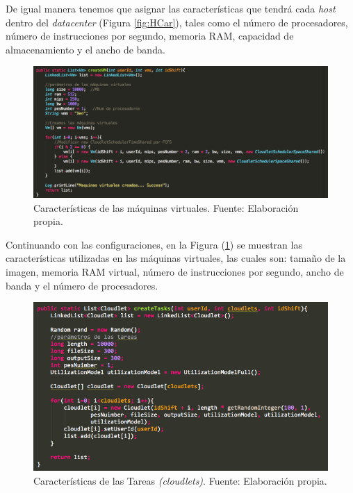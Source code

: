 De igual manera tenemos que asignar las caracter\'isticas que tendr\'a cada \textit{host} dentro del \textit{datacenter} (Figura \ref{fig:HCar}), tales como el n\'umero de procesadores, n\'umero de instrucciones por segundo, memoria RAM, capacidad de almacenamiento y el ancho de banda.

\newpage

\renewcommand\thefigure{\arabic{figure}}
\begin{figure}[h!]
	\centering
	\includegraphics[scale=0.3]{media/creacion_vm}
	\caption{Características de las máquinas virtuales. Fuente: Elaboración propia.}
	\label{fig:VCar}
\end{figure}


Continuando con las configuraciones, en la Figura (\ref{fig:VCar}) se muestran las caracter\'isticas utilizadas en las m\'aquinas virtuales, las cuales son: tamaño de la imagen, memoria RAM virtual, n\'umero de instrucciones por segundo, ancho de banda y el n\'umero de procesadores.


\renewcommand\thefigure{\arabic{figure}}
\begin{figure}[h!]
	\centering
	\includegraphics[scale=0.5]{media/CloudletCreateTask}
	\caption{Características de las Tareas \textit{(cloudlets)}. Fuente: Elaboración propia.}
	\label{fig:TCar}
\end{figure} 





